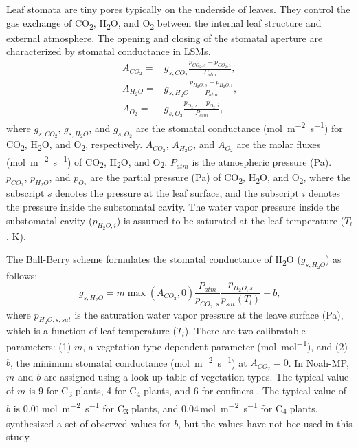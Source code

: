 \documentclass[essd]{copernicus}
\begin{document}
Leaf stomata are tiny pores typically on the underside of leaves. They control
the gas exchange of CO\textsubscript{2}, H\textsubscript{2}O, and
O\textsubscript{2} between the internal leaf structure and external atmosphere.
The opening and closing of the stomatal aperture are characterized by stomatal
conductance in LSMs.
\begin{align}
  A_{CO_2} = & g_{s,CO_2} \frac{p_{CO_2,s} - p_{CO_2,i}}{P_{atm}} \text{,} \\
  A_{H_2O} = & g_{s,H_2O} \frac{p_{H_2O,s} - p_{H_2O,i}}{P_{atm}} \text{,} \\
  A_{O_2} =  & g_{s,O_2} \frac{p_{O_2,s} - p_{O_2,i}}{P_{atm}} \text{,}
\end{align}
where \(g_{s,CO_2}\), \(g_{s,H_2O}\), and \(g_{s,O_2}\) are the stomatal
conductance (\si{mol~m^{-2}~s^{-1}}) for CO\textsubscript{2},
H\textsubscript{2}O, and O\textsubscript{2}, respectively. \(A_{CO_2}\),
\(A_{H_2O}\), and \(A_{O_2}\) are the molar fluxes (\si{mol~m^{-2}~s^{-1}}) of
CO\textsubscript{2}, H\textsubscript{2}O, and O\textsubscript{2}. \(P_{atm}\) is
the atmospheric pressure (\si{Pa}). \(p_{CO_2}\), \(p_{H_2O}\), and \(p_{O_2}\)
are the partial pressure (\si{Pa}) of CO\textsubscript{2}, H\textsubscript{2}O,
and O\textsubscript{2}, where the subscript \(s\) denotes the pressure at the
leaf surface, and the subscript \(i\) denotes the pressure inside the
substomatal cavity. The water vapor pressure inside the substomatal cavity
(\(p_{H_2O,i}\)) is assumed to be saturated at the leaf temperature (\(T_l\),
\si{K}).

The Ball-Berry scheme \citep{ball1987PiPR, collatz1991AFM, collatz1992FPB}
formulates the stomatal conductance of H\textsubscript{2}O (\(g_{s,H_2O}\)) as
follows:
\begin{equation}
  g_{s,H_2O} = m \max(A_{CO_2},0) \frac{P_{atm}}{p_{CO_2,s}}\frac{p_{H_2O,s}}{p_{sat}(T_l)} + b \text{,}
\end{equation}
where \(p_{H_2O,s,sat}\) is the saturation water vapor pressure at the leave
surface (\si{Pa}), which is a function of leaf temperature (\(T_l\)). There are
two calibratable parameters: (1) \(m\), a vegetation-type dependent parameter
(\si{mol~mol^{-1}}), and (2) \(b\), the minimum stomatal conductance
(\si{mol~m^{-2}~s^{-1}}) at \(A_{CO_2} = 0\). In Noah-MP, \(m\) and \(b\) are
assigned using a look-up table of vegetation types. The typical value of \(m\)
is 9 for C\textsubscript{3} plants, 4 for C\textsubscript{4} plants, and 6 for
confiners \citep{sellers1996JC}. The typical value of \(b\) is
\(0.01\)\,\si{mol~m^{-2}~s^{-1}} for C\textsubscript{3} plants, and
\(0.04\)\,\si{mol~m^{-2}~s^{-1}} for C\textsubscript{4} plants.
\citet{Lombardozzi2017GMD} synthesized a set of observed values for \(b\), but
the values have not bee used in this study.
\end{document}
